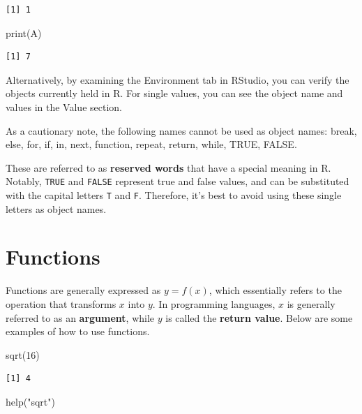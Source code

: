 \documentclass[
  a4paper,
]{book}
\newenvironment{Shaded}{\begin{snugshade}}{\end{snugshade}}
\newcommand{\DecValTok}[1]{\textcolor[rgb]{0.68,0.00,0.00}{#1}}
\newcommand{\FunctionTok}[1]{\textcolor[rgb]{0.28,0.35,0.67}{#1}}
\newcommand{\NormalTok}[1]{\textcolor[rgb]{0.00,0.23,0.31}{#1}}
\newcommand{\StringTok}[1]{\textcolor[rgb]{0.13,0.47,0.30}{#1}}
\begin{document}
\begin{verbatim}
[1] 1
\end{verbatim}

\begin{Shaded}
\begin{Highlighting}[]
\FunctionTok{print}\NormalTok{(A)}
\end{Highlighting}
\end{Shaded}

\begin{verbatim}
[1] 7
\end{verbatim}

Alternatively, by examining the Environment tab in RStudio, you can
verify the objects currently held in R. For single values, you can see
the object name and values in the Value section.

As a cautionary note, the following names cannot be used as object
names: break, else, for, if, in, next, function, repeat, return, while,
TRUE, FALSE.

These are referred to as \textbf{reserved words} that have a special
meaning in R. Notably, \texttt{TRUE} and \texttt{FALSE} represent true
and false values, and can be substituted with the capital letters
\texttt{T} and \texttt{F}. Therefore, it's best to avoid using these
single letters as object names.

\section{Functions}\label{functions}

Functions are generally expressed as \(y=f(x)\), which essentially
refers to the operation that transforms \(x\) into \(y\). In programming
languages, \(x\) is generally referred to as an \textbf{argument}, while
\(y\) is called the \textbf{return value}. Below are some examples of
how to use functions.

\begin{Shaded}
\begin{Highlighting}[]
\FunctionTok{sqrt}\NormalTok{(}\DecValTok{16}\NormalTok{)}
\end{Highlighting}
\end{Shaded}

\begin{verbatim}
[1] 4
\end{verbatim}

\begin{Shaded}
\begin{Highlighting}[]
\FunctionTok{help}\NormalTok{(}\StringTok{"sqrt"}\NormalTok{)}
\end{Highlighting}
\end{Shaded}
\end{document}
